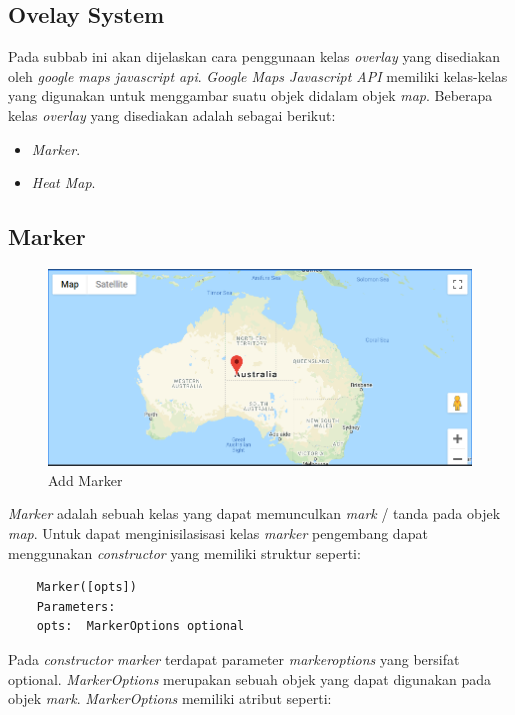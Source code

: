 \subsection{Ovelay System}
Pada subbab ini akan dijelaskan cara penggunaan kelas \textit{overlay} yang disediakan oleh \textit{google maps javascript api}. \textit{Google Maps Javascript API } memiliki  kelas-kelas yang digunakan untuk menggambar suatu objek didalam objek \textit{map}. Beberapa kelas \textit{overlay} yang disediakan adalah sebagai berikut:

\begin{itemize}
    \item \textit{Marker}.
    \item \textit{Heat Map}.
\end{itemize}

\subsection{Marker}
  \begin{figure}[H]
    \centering
    \includegraphics[scale=0.5]{Gambar/add_marker.PNG}
    \caption{Add Marker}
    \label{fig:my_label}
\end{figure}

\textit{Marker} adalah sebuah kelas yang dapat memunculkan \textit{mark} / tanda pada objek \textit{map}. Untuk dapat menginisilasisasi kelas \textit{marker} pengembang dapat menggunakan \textit{constructor} yang memiliki struktur seperti:
\begin{lstlisting}
    Marker([opts])
    Parameters: 
    opts:  MarkerOptions optional
\end{lstlisting}
Pada \textit{constructor} \textit{marker} terdapat parameter \textit{markeroptions} yang bersifat optional. \textit{MarkerOptions} merupakan sebuah objek yang dapat digunakan pada objek \textit{mark}. \textit{MarkerOptions} memiliki atribut seperti:

